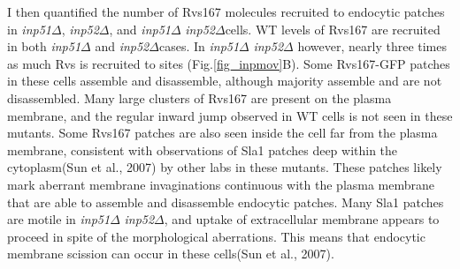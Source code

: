 \vspace{5mm}
I then quantified the number of Rvs167 molecules recruited to endocytic patches in \textit{inp51$\Delta$}, \textit{inp52$\Delta$}, and \textit{inp51$\Delta$} \textit{inp52$\Delta$}cells.  WT levels of Rvs167 are recruited in both \textit{inp51$\Delta$} and \textit{inp52$\Delta$}cases. In \textit{inp51$\Delta$} \textit{inp52$\Delta$} however, nearly three times as much Rvs is recruited to sites (Fig.\ref{fig_inpmov}B). Some Rvs167-GFP patches in these cells assemble and disassemble, although majority assemble and are not disassembled. Many large clusters of Rvs167 are present on the plasma membrane, and the regular inward jump observed in WT cells is not seen in these mutants. Some Rvs167 patches are also seen inside the cell far from the plasma membrane, consistent with observations of Sla1 patches deep within the cytoplasm(Sun et al., 2007) by other labs in these mutants. These patches likely mark aberrant membrane invaginations continuous with the plasma membrane that are able to assemble and disassemble endocytic patches. Many Sla1 patches are motile in \textit{inp51$\Delta$} \textit{inp52$\Delta$}, and uptake of extracellular membrane appears to proceed in spite of the morphological aberrations. This means that endocytic membrane scission can occur in these cells(Sun et al., 2007). 




